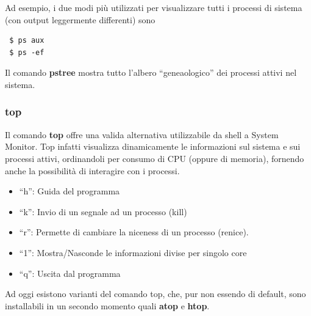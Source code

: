 Ad esempio, i due modi più utilizzati per visualizzare tutti i processi di sistema (con output leggermente differenti) sono

\begin{verbatim}
 $ ps aux
 $ ps -ef
\end{verbatim}

Il comando \textbf{pstree} mostra tutto l'albero ``geneaologico'' dei processi attivi nel sistema. 

\subsubsection{top}

Il comando \textbf{top} offre una valida alternativa utilizzabile da shell a System Monitor. Top infatti visualizza dinamicamente le informazioni sul sistema e sui processi attivi, ordinandoli per consumo di CPU (oppure di memoria), fornendo anche la possibilità di interagire con i processi.

\begin{itemize}
 \item ``h'': Guida del programma
 \item ``k'': Invio di un segnale ad un processo (kill)
 \item ``r'': Permette di cambiare la niceness di un processo (renice).
 \item ``1'': Mostra/Nasconde le informazioni divise per singolo core
 \item ``q'': Uscita dal programma
\end{itemize}

Ad oggi esistono varianti del comando top, che, pur non essendo di default, sono installabili in un secondo momento quali \textbf{atop} e \textbf{htop}.

